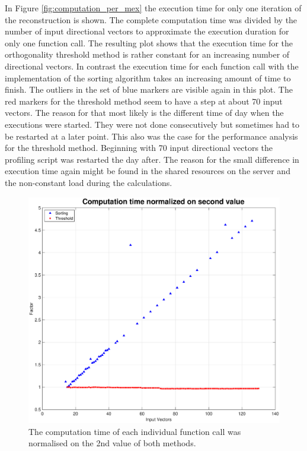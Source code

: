 In Figure \ref{fig:computation_per_mex} the execution time for only one iteration of the reconstruction is shown. The complete computation time was divided by the number of input directional vectors to approximate the execution duration for only one function call. The resulting plot shows that the execution time for the orthogonality threshold method is rather constant for an increasing number of directional vectors. In contrast the execution time for each function call with the implementation of the sorting algorithm takes an increasing amount of time to finish. The outliers in the set of blue markers are visible again in this plot. The red markers for the threshold method seem to have a step at about 70 input vectors. The reason for that most likely is the different time of day when the executions were started. They were not done consecutively but sometimes had to be restarted at a later point. This also was the case for the performance analysis for the threshold method. Beginning with 70 input directional vectors the profiling script was restarted the day after. The reason for the small difference in execution time again might be found in the shared resources on the server and the non-constant load during the calculations. 



\begin{figure}[H]
    \centering
    \includegraphics[width=1.08\textwidth]{Graphics/Results/computation_normlaized_2nd_value.eps}
    \caption{The computation time of each individual function call was normalised on the 2nd value of both methods.}
    \label{fig:computation_normlaized_2nd}
\end{figure}


